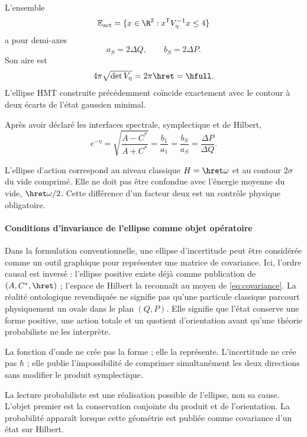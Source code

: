 L’ensemble
\begin{equation}
\mathbb E_{\mathrm{act}}
=\{x\in\R^2:x^{\mathsf T}V_\eta^{-1}x\le4\}
\label{eq:mahalanobis}
\end{equation}
a pour demi-axes
\begin{equation}
a_S=2\Delta Q,\qquad b_S=2\Delta P.
\label{eq:two-sigma}
\end{equation}
Son aire est
\[
4\pi\sqrt{\det V_\eta}=2\pi\hret=\hfull.
\]
L'ellipse HMT construite précédemment coïncide exactement avec le contour à deux
écarts de l'état gaussien minimal.

\begin{proposition}
Après avoir déclaré les interfaces spectrale, symplectique et de Hilbert,
\begin{equation}
\boxed{
e^{-\eta}
=\sqrt{\frac{A-C^*}{A+C^*}}
=\frac{b_1}{a_1}
=\frac{b_S}{a_S}
=\frac{\Delta P}{\Delta Q}.}
\label{eq:shape-chain-hilbert}
\end{equation}
\end{proposition}

L'ellipse d'action correspond au niveau classique \(H=\hret\omega\) et au
contour \(2\sigma\) du vide comprimé. Elle ne doit pas être confondue avec l'énergie
moyenne du vide, \(\hret\omega/2\). Cette différence d'un facteur deux est un
contrôle physique obligatoire.

\paragraph{Conditions d'invariance de l'ellipse comme objet opératoire}

Dans la formulation conventionnelle, une ellipse d'incertitude peut être considérée comme
un outil graphique pour représenter une matrice de covariance. Ici, l'ordre
causal est inversé : l'ellipse positive existe déjà comme publication de
\((A,C^*,\hret)\) ; l'espace de Hilbert la reconnaît au moyen de
\eqref{eq:covariance}. La réalité ontologique revendiquée ne signifie pas qu'une
particule classique parcourt physiquement un ovale dans le plan \((Q,P)\). Elle signifie
que l'état conserve une forme positive, une action totale et un quotient
d'orientation avant qu'une théorie probabiliste ne les interprète.

La fonction d'onde ne crée pas la forme ; elle la représente. L'incertitude ne crée pas
\(\hbar\) ; elle publie l'impossibilité de comprimer simultanément les deux
directions sans modifier le produit symplectique.

\begin{narrativebox}
La lecture probabiliste est une réalisation possible de l'ellipse, non sa cause.
L'objet premier est la conservation conjointe du produit et de l'orientation. La
probabilité apparaît lorsque cette géométrie est publiée comme covariance d'un
état sur Hilbert.
\end{narrativebox}

